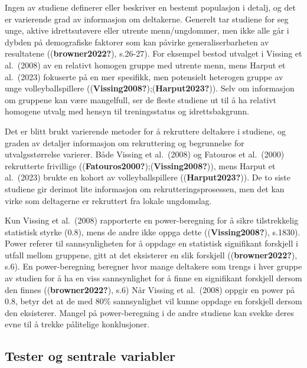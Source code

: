 \documentclass[
  letterpaper,
  DIV=11,
  numbers=noendperiod]{scrreprt}
\begin{document}
Ingen av studiene definerer eller beskriver en bestemt populasjon i
detalj, og det er varierende grad av informasjon om deltakerne. Generelt
tar studiene for seg unge, aktive idrettsutøvere eller utrente
menn/ungdommer, men ikke alle går i dybden på demografiske faktorer som
kan påvirke generaliserbarheten av resultatene ((\textbf{browner2022?}),
s.26-27). For eksempel bestod utvalget i Vissing et al.~(2008) av en
relativt homogen gruppe med utrente menn, mens Harput et al.~(2023)
fokuserte på en mer spesifikk, men potensielt heterogen gruppe av unge
volleyballspillere ((\textbf{Vissing2008?});(\textbf{Harput2023?})).
Selv om informasjon om gruppene kan være mangelfull, ser de fleste
studiene ut til å ha relativt homogene utvalg med hensyn til
treningsstatus og idrettsbakgrunn.

Det er blitt brukt varierende metoder for å rekruttere deltakere i
studiene, og graden av detaljer informasjon om rekruttering og
begrunnelse for utvalgsstørrelse varierer. Både Vissing et al.~(2008) og
Fatouros et al.~(2000) rekrutterte frivillige
((\textbf{Fatouros2000?});(\textbf{Vissing2008?})), mens Harput et
al.~(2023) brukte en kohort av volleyballspillere
((\textbf{Harput2023?})). De to siste studiene gir derimot lite
informasjon om rekrutteringsprosessen, men det kan virke som deltagerne
er rekruttert fra lokale ungdomslag.

Kun Vissing et al.~(2008) rapporterte en power-beregning for å sikre
tilstrekkelig statistisk styrke (0.8), mens de andre ikke oppga dette
((\textbf{Vissing2008?}), s.1830). Power referer til sannsynligheten for
å oppdage en statistisk signifikant forskjell i utfall mellom gruppene,
gitt at det eksisterer en slik forskjell ((\textbf{browner2022?}), s.6).
En power-beregning beregner hvor mange deltakere som trengs i hver
gruppe av studien for å ha en viss sannsynlighet for å finne en
signifikant forskjell dersom den finnes ((\textbf{browner2022?}), s.6)
Når Vissing et al.~(2008) oppgir en power på 0.8, betyr det at de med
80\% sannsynlighet vil kunne oppdage en forskjell dersom den eksisterer.
Mangel på power-beregning i de andre studiene kan svekke deres evne til
å trekke pålitelige konklusjoner.

\subsection{Tester og sentrale
variabler}\label{tester-og-sentrale-variabler}
\end{document}
